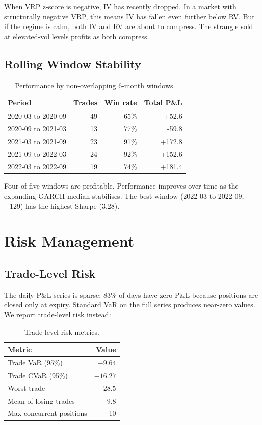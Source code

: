 \documentclass[11pt,a4paper]{article}
\begin{document}
When VRP z-score is negative, IV has recently dropped. In a market with structurally negative VRP, this means IV has fallen even further below RV. But if the regime is calm, both IV and RV are about to compress. The strangle sold at elevated-vol levels profits as both compress.

\subsection{Rolling Window Stability}

\begin{table}[H]
\centering
\caption{Performance by non-overlapping 6-month windows.}
\begin{tabular}{lrrr}
\toprule
Period & Trades & Win rate & Total P\&L \\
\midrule
2020-03 to 2020-09 & 49 & 65\% & +52.6 \\
2020-09 to 2021-03 & 13 & 77\% & -59.8 \\
2021-03 to 2021-09 & 23 & 91\% & +172.8 \\
2021-09 to 2022-03 & 24 & 92\% & +152.6 \\
2022-03 to 2022-09 & 19 & 74\% & +181.4 \\
\bottomrule
\end{tabular}
\end{table}

Four of five windows are profitable. Performance improves over time as the expanding GARCH median stabilises. The best window (2022-03 to 2022-09, +129) has the highest Sharpe (3.28).


\section{Risk Management}

\subsection{Trade-Level Risk}

The daily P\&L series is sparse: 83\% of days have zero P\&L because positions are closed only at expiry. Standard VaR on the full series produces near-zero values. We report trade-level risk instead:

\begin{table}[H]
\centering
\caption{Trade-level risk metrics.}
\begin{tabular}{lr}
\toprule
Metric & Value \\
\midrule
Trade VaR (95\%) & $-9.64$ \\
Trade CVaR (95\%) & $-16.27$ \\
Worst trade & $-28.5$ \\
Mean of losing trades & $-9.8$ \\
Max concurrent positions & 10 \\
\bottomrule
\end{tabular}
\end{table}
\end{document}
